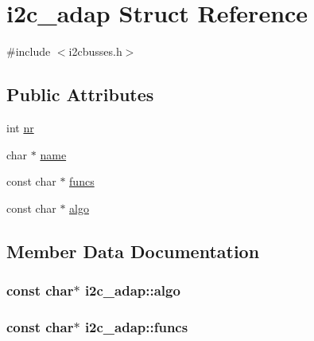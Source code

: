 \hypertarget{structi2c__adap}{}\section{i2c\+\_\+adap Struct Reference}
\label{structi2c__adap}


{\ttfamily \#include $<$i2cbusses.\+h$>$}

\subsection*{Public Attributes}
\begin{DoxyCompactItemize}
\item 
int \hyperlink{structi2c__adap_addd7cc4b8e16049cdf030d00d4568477}{nr}
\item 
char $\ast$ \hyperlink{structi2c__adap_a70e3d02d26daacc6adf10cd026a7e2ee}{name}
\item 
const char $\ast$ \hyperlink{structi2c__adap_add760a893a89ee576efa201388fc9944}{funcs}
\item 
const char $\ast$ \hyperlink{structi2c__adap_a052f8b04c1278111548a8fed665613e6}{algo}
\end{DoxyCompactItemize}


\subsection{Member Data Documentation}
\hypertarget{structi2c__adap_a052f8b04c1278111548a8fed665613e6}{}
\subsubsection[{algo}]{\setlength{\rightskip}{0pt plus 5cm}const char$\ast$ i2c\+\_\+adap\+::algo}\label{structi2c__adap_a052f8b04c1278111548a8fed665613e6}
\hypertarget{structi2c__adap_add760a893a89ee576efa201388fc9944}{}
\subsubsection[{funcs}]{\setlength{\rightskip}{0pt plus 5cm}const char$\ast$ i2c\+\_\+adap\+::funcs}\label{structi2c__adap_add760a893a89ee576efa201388fc9944}
\hypertarget{structi2c__adap_a70e3d02d26daacc6adf10cd026a7e2ee}{}

